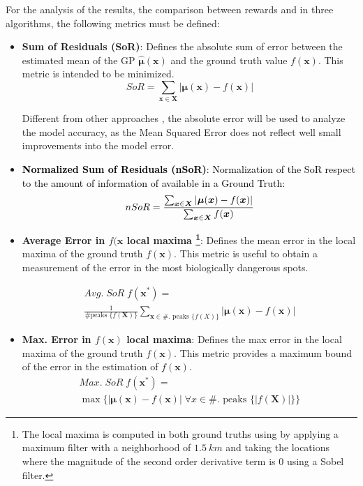 \documentclass[journal]{IEEEtran}
\newcommand\changes[1]{\textcolor{black}{#1}}
\newcommand\vect[1]{\boldsymbol{#1}}
\begin{document}
For the analysis of the results, the comparison between rewards and in three algorithms, the following metrics must be defined:

\begin{itemize}
    \item \textbf{Sum of Residuals (SoR)}: Defines the absolute sum of error between the estimated mean of the GP $\vect{\hat \mu}(\vect{x})$ and the ground truth value $f(\vect{x})$. This metric is intended to be minimized.
    \[
        SoR = \sum_{\vect{x} \in \vect{X}} | \vect{\mu}(\vect{x}) - f(\vect{x})|
    \]

    Different from other approaches \cite{peralta_MULTIOBJECTIVE, kathen_informative_2021}, the absolute error will be used to analyze the model accuracy, as the Mean Squared Error does not reflect well small improvements into the model error.

    \item \changes{\textbf{Normalized Sum of Residuals (nSoR)}: Normalization of the SoR respect to the amount of information of available in a Ground Truth:}
    \[
        \changes{nSoR = \frac{\sum_{\vect{x} \in \vect{X}} | \vect{\mu}(\vect{x}) - f(\vect{x})|}{\sum_{\vect{x} \in \vect{X}}{f(\vect{x})}}}
    \]
    
    \item \textbf{Average Error in $f(\vect{x}$ local maxima \footnote{The local maxima is computed in both ground truths using by applying a maximum filter with a neighborhood of $1.5~km$ and taking the locations where the magnitude of the second order derivative term is 0 using a Sobel filter.}}: Defines the mean error in the local maxima of the ground truth $f(\vect{x})$. This metric is useful to obtain a measurement of the error in the most biologically dangerous spots.

    \begin{equation}
    \begin{split}
        Avg. \; SoR \; f(\vect{x}^*) = \\
        \frac{1}{\text{\# peaks }\{f(\vect{X})\}} \sum_{\vect{x} \in \text{\#. peaks }\{f(X)\}} |\vect{\mu}(\vect{x}) - f(\vect{x}) |
    \end{split}
    \end{equation}

    
    \item \textbf{Max. Error in $f(\vect{x})$ local maxima}: Defines the max error in the local maxima of the ground truth $f(\vect{x})$. This metric provides a maximum bound of the error in the estimation of $f(\vect{x})$.
    \begin{equation}
    \begin{split}
        Max. \; SoR \; f(\vect{x}^*) = \\
        \max \{ | \vect{\mu(x)} - f(\vect{x}) | \; \forall x \in \text{\#. peaks }\{|f(\vect{X})|\} \} 
    \end{split}
    \end{equation}
    
\end{itemize}
\end{document}
